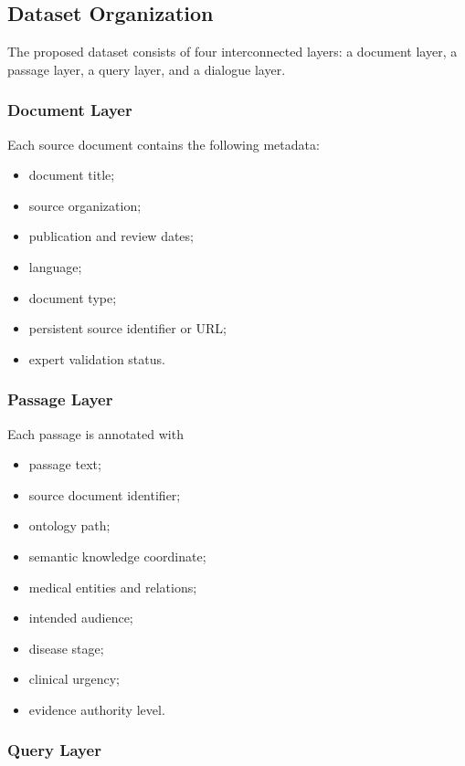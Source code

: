 \documentclass{article}
\begin{document}
\subsection{Dataset Organization}

The proposed dataset consists of four interconnected layers: a document layer, 
a passage layer, a query layer, and a dialogue layer.

\subsubsection{Document Layer}

Each source document contains the following metadata:

\begin{itemize}
    \item document title;
    \item source organization;
    \item publication and review dates;
    \item language;
    \item document type;
    \item persistent source identifier or URL;
    \item expert validation status.
\end{itemize}

\subsubsection{Passage Layer}

Each passage is annotated with

\begin{itemize}
    \item passage text;
    \item source document identifier;
    \item ontology path;
    \item semantic knowledge coordinate;
    \item medical entities and relations;
    \item intended audience;
    \item disease stage;
    \item clinical urgency;
    \item evidence authority level.
\end{itemize}

\subsubsection{Query Layer}
\end{document}
